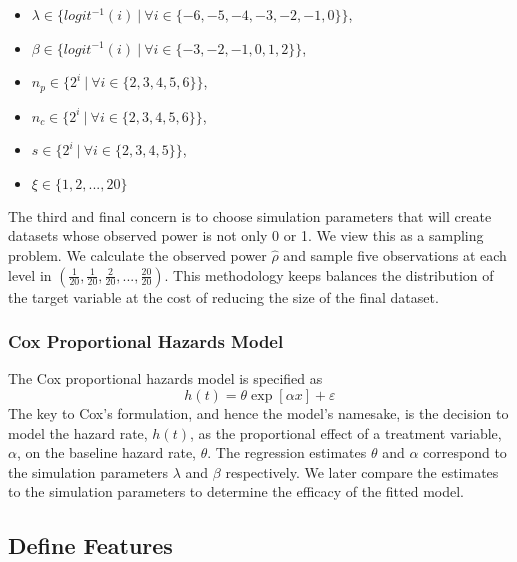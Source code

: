 \begin{itemize}
    \item $\lambda \in \lbrace logit^{-1}(i) ~|~ \forall i \in \lbrace -6, -5, -4, -3, -2, -1, 0 \rbrace \rbrace$,
    \item $\beta \in \lbrace logit^{-1}(i) ~|~ \forall i \in \lbrace -3, -2, -1, 0, 1, 2 \rbrace \rbrace$,
    \item $n_p \in \lbrace 2^i ~|~ \forall i \in \lbrace 2, 3, 4, 5, 6 \rbrace \rbrace$, 
    \item $n_c \in \lbrace 2^i ~|~ \forall i \in \lbrace 2, 3, 4, 5, 6 \rbrace \rbrace$, 
    \item $s \in \lbrace 2^i ~|~ \forall i \in \lbrace 2, 3, 4, 5 \rbrace \rbrace$,
    \item $\xi \in \lbrace 1, 2, ..., 20 \rbrace$
\end{itemize}

The third and final concern is to choose simulation parameters that will create datasets whose observed power is not only 0 or 1. We view this as a sampling problem. We calculate the observed power $\hat \rho$ and sample five observations at each level in $(\frac{1}{20}, \frac{1}{20}, \frac{2}{20}, ..., \frac{20}{20})$. This methodology keeps balances the distribution of the target variable at the cost of reducing the size of the final dataset.

\subsubsection{Cox Proportional Hazards Model}

The Cox proportional hazards model is specified as 
%
\begin{equation}
\label{eq:cox}
    h(t) = \theta \exp \left[ \alpha x \right] + \varepsilon
\end{equation}
%
The key to Cox's formulation, and hence the model's namesake, is the decision to model the hazard rate, $h(t)$, as the proportional effect of a treatment variable, $\alpha$, on the baseline hazard rate, $\theta$. The regression estimates $\theta$ and $\alpha$ correspond to the simulation parameters $\lambda$ and $\beta$ respectively. We later compare the estimates to the simulation parameters to determine the efficacy of the fitted model.

\subsection{Define Features}

